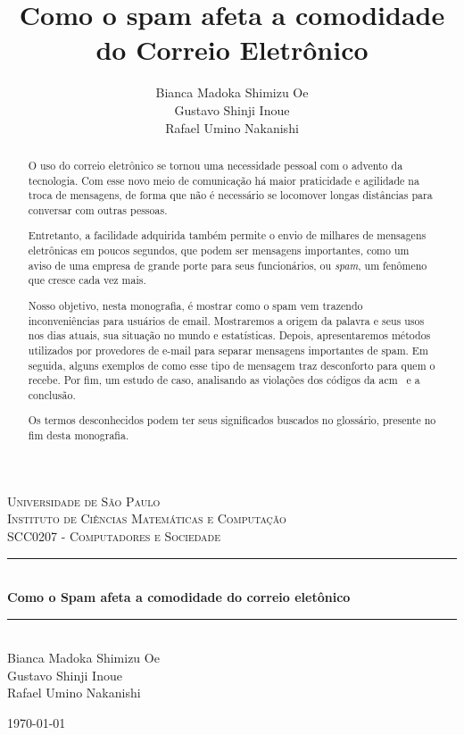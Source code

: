 \documentclass[a4paper,dvipdfm]{article}
\title{Como o spam afeta a comodidade do Correio Eletrônico}
\author{Bianca Madoka Shimizu Oe\\
		Gustavo Shinji Inoue\\
		Rafael Umino Nakanishi}
\begin{document}
\begin{titlepage}
	\begin{center}
		\textsc{\huge Universidade de São Paulo}\\[0.3cm]
		\textsc{\Large Instituto de Ciências Matemáticas e Computação}\\[0.5cm]
		\textsc{\large SCC0207 - Computadores e Sociedade}\\[2.5in]
	
		\rule{\linewidth}{0.5mm} \\[0.7cm]
		{ \huge \bfseries Como o Spam afeta a comodidade do correio eletônico}\\[0.6cm]
		\rule{\linewidth}{0.5mm}\\[3in]

		{\large Bianca Madoka Shimizu Oe\\
		Gustavo Shinji Inoue\\
		Rafael Umino Nakanishi\\}

	\vfill
	\today
	\end{center}

\end{titlepage}

\newpage

\begin{abstract}
	O uso do correio eletrônico se tornou uma necessidade pessoal com o advento da tecnologia. Com esse novo meio de comunicação há maior praticidade e agilidade na troca de mensagens, de forma que não é necessário se locomover longas distâncias para conversar com outras pessoas.

	Entretanto, a facilidade adquirida também permite o envio de milhares de mensagens eletrônicas em poucos segundos, que podem ser mensagens importantes, como um aviso de uma empresa de grande porte para seus funcionários, ou \emph{spam}, um fenômeno que cresce cada vez mais.

	Nosso objetivo, nesta monografia, é mostrar como o spam vem trazendo inconveniências para usuários de \gls{email}.
	Mostraremos a origem da palavra e seus usos nos dias atuais, sua situação no mundo e estatísticas.
	Depois, apresentaremos métodos utilizados por provedores de e-mail para separar mensagens importantes de spam.
	Em seguida, alguns exemplos de como esse tipo de mensagem traz desconforto para quem o recebe. 
	Por fim, um estudo de caso, analisando as violações dos códigos da \gls{acm}~\cite{acm} e a conclusão.
	
	Os termos desconhecidos podem ter seus significados buscados no glossário, presente no fim desta monografia.
\end{abstract}
\end{document}
